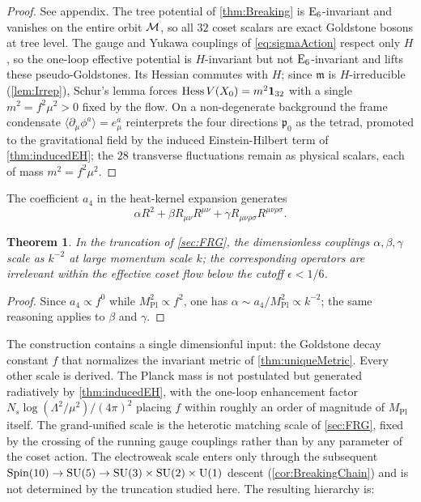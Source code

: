 \documentclass[pdflatex,sn-mathphys-num]{sn-jnl}
\theoremstyle{thmstyleone}
\newtheorem{theorem}{Theorem}
\theoremstyle{thmstylethree}%
\theoremstyle{thmstyletwo}%
\begin{document}
\begin{proof}
See appendix. The tree potential of \autoref{thm:Breaking}
is $\mathrm{E}_{6}$-invariant and vanishes on the entire orbit $\mathcal{M}$, so all $32$ coset
scalars are exact Goldstone bosons at tree level. The gauge and Yukawa
couplings of \eqref{eq:sigmaAction} respect only $H$, so the one-loop effective
potential is $H$-invariant but not $\mathrm{E}_{6}$-invariant and lifts these
pseudo-Goldstones. Its Hessian commutes with $H$; since $\mathfrak m$ is
$H$-irreducible (\autoref{lem:Irrep}), Schur's lemma forces
$\operatorname{Hess} V(X_{0})=m^{2}\mathbf 1_{32}$ with a single
$m^{2}=f^{2}\mu^{2}>0$ fixed by the flow. On a non-degenerate background the frame
condensate $\langle\partial_\mu\phi^{a}\rangle=e_\mu^{a}$ reinterprets
the four directions $\mathfrak p_{0}$ as the tetrad, promoted to the
gravitational field by the induced Einstein-Hilbert term of
\autoref{thm:inducedEH}; the $28$ transverse fluctuations remain as physical
scalars, each of mass $m^{2}=f^{2}\mu^{2}$.
\end{proof}

The coefficient $a_{4}$ in the heat-kernel expansion generates
\[
  \alpha R^{2} + \beta R_{\mu\nu} R^{\mu\nu}
  + \gamma R_{\mu\nu\rho\sigma} R^{\mu\nu\rho\sigma}.
\]

\begin{theorem}\label{prop:irrelevant}
In the truncation of \autoref{sec:FRG}, the dimensionless couplings
$\alpha,\beta,\gamma$ scale as $k^{-2}$ at large momentum scale $k$; the
corresponding operators are irrelevant within the effective coset flow below
the cutoff \(\epsilon<1/6\).
\end{theorem}

\begin{proof}
Since $a_{4} \propto f^{0}$ while $M_{\mathrm{Pl}}^{2} \propto f^{2}$, one has $\alpha \sim a_{4} / M_{\mathrm{Pl}}^{2} \propto k^{-2}$; the same reasoning applies to $\beta$ and $\gamma$.
\end{proof}

The construction contains a single dimensionful input: the Goldstone decay
constant $f$ that normalizes the invariant metric of
\autoref{thm:uniqueMetric}. Every other scale is derived. The Planck mass is
not postulated but generated radiatively by \autoref{thm:inducedEH}, with the
one-loop enhancement factor $N_{s}\log(\Lambda^{2}/\mu^{2})/(4\pi)^{2}$
placing $f$ within roughly an order of magnitude of $M_{\mathrm{Pl}}$ itself.
The grand-unified scale is the heterotic matching scale of
\autoref{sec:FRG}, fixed by the crossing of the running gauge
couplings rather than by any parameter of the coset action. The electroweak
scale enters only through the subsequent
$\operatorname{Spin}(10)\to\mathrm{SU(5)}\to\mathrm{SU(3)}\times\mathrm{SU(2)}\times\mathrm{U(1)}$ descent
(\autoref{cor:BreakingChain}) and is not determined by the truncation studied
here. The resulting hierarchy is:
\end{document}
